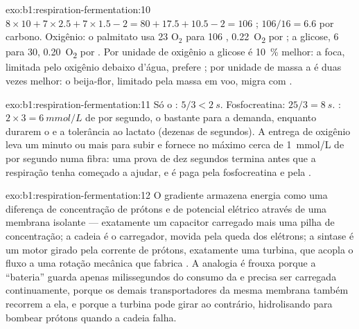 \begin{solution}{exo:b1:respiration-fermentation:10}
$8\times 10 + 7\times 2.5 + 7\times 1.5 - 2 = 80 + 17.5 + 10.5 - 2 =
106$ ; $106/16 = 6.6$ por carbono. Oxigênio: o palmitato usa 23
$\mathrm{O_2}$ para 106 , \qty{0.22}{O_2} por ; a glicose, 6 para
30, \qty{0.20}{O_2} por . Por unidade de oxigênio a glicose é
\qty{10}{\%} melhor: a foca, limitada pelo oxigênio debaixo d'água,
prefere ; por unidade de massa a  é duas vezes melhor:
o beija-flor, limitado pela massa em voo, migra com .
\end{solution}

\begin{solution}{exo:b1:respiration-fermentation:11}
Só o : $5/3 < \qty{2}{s}$. Fosfocreatina: $25/3 = \qty{8}{s}$.
: $2\times 3 = \qty{6}{mmol/L}$ de  por segundo, o
bastante para a demanda, enquanto durarem o  e a tolerância ao
lactato (dezenas de segundos). A entrega de oxigênio leva um minuto ou
mais para subir e fornece no máximo cerca de \qty{1}{mmol/L} de  por
segundo numa fibra: uma prova de dez segundos termina antes que a
respiração tenha começado a ajudar, e é paga pela fosfocreatina e pela
.
\end{solution}

\begin{solution}{exo:b1:respiration-fermentation:12}
O gradiente armazena energia como uma diferença de concentração de
prótons e de potencial elétrico através de uma membrana isolante ---
exatamente um capacitor carregado mais uma pilha de concentração; a
cadeia é o carregador, movida pela queda dos elétrons; a sintase é um
motor girado pela corrente de prótons, exatamente uma turbina, que
acopla o fluxo a uma rotação mecânica que fabrica . A analogia é
frouxa porque a ``bateria'' guarda apenas milissegundos do consumo da
 e precisa ser carregada continuamente, porque os demais
transportadores da mesma membrana também recorrem a ela, e porque a
turbina pode girar ao contrário, hidrolisando  para bombear prótons
quando a cadeia falha.
\end{solution}

